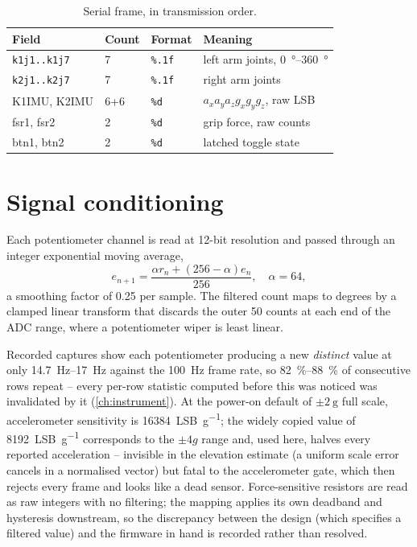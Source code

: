 \begin{table}[htbp]
  \centering
  \small
  \caption{Serial frame, in transmission order.}
  \label{tab:frame}
  \begin{tabular}{@{}llll@{}}
    \toprule
    Field & Count & Format & Meaning \\
    \midrule
    \texttt{k1j1..k1j7} & 7 & \texttt{\%.1f} & left arm joints, \SIrange{0}{360}{\degree} \\
    \texttt{k2j1..k2j7} & 7 & \texttt{\%.1f} & right arm joints \\
    K1IMU, K2IMU & 6+6 & \texttt{\%d} & $a_x a_y a_z g_x g_y g_z$, raw LSB \\
    fsr1, fsr2 & 2 & \texttt{\%d} & grip force, raw counts \\
    btn1, btn2 & 2 & \texttt{\%d} & latched toggle state \\
    \bottomrule
  \end{tabular}
\end{table}

\section{Signal conditioning}

Each potentiometer channel is read at 12-bit resolution and passed through
an integer exponential moving average,
\begin{equation}
  e_{n+1} = \frac{\alpha r_n + (256-\alpha) e_n}{256}, \quad \alpha=64,
  \label{eq:ema}
\end{equation}
a smoothing factor of 0.25 per sample. The filtered count maps to degrees by
a clamped linear transform that discards the outer 50 counts at each end of
the ADC range, where a potentiometer wiper is least linear.

Recorded captures show each potentiometer producing a new \emph{distinct}
value at only \SIrange{14.7}{17}{\hertz} against the \SI{100}{\hertz} frame
rate, so \SIrange{82}{88}{\percent} of consecutive rows repeat -- every
per-row statistic computed before this was noticed was invalidated by it
(\cref{ch:instrument}). At the power-on default of $\pm\SI{2}{\gram}$ full
scale, accelerometer sensitivity is \SI{16384}{LSB\per\gram}; the widely
copied value of \SI{8192}{LSB\per\gram} corresponds to the $\pm4g$ range and,
used here, halves every reported acceleration -- invisible in the elevation
estimate (a uniform scale error cancels in a normalised vector) but fatal to
the accelerometer gate, which then rejects every frame and looks like a dead
sensor. Force-sensitive resistors are read as raw integers with no
filtering; the mapping applies its own deadband and hysteresis downstream,
so the discrepancy between the design (which specifies a filtered value)
and the firmware in hand is recorded rather than resolved.

